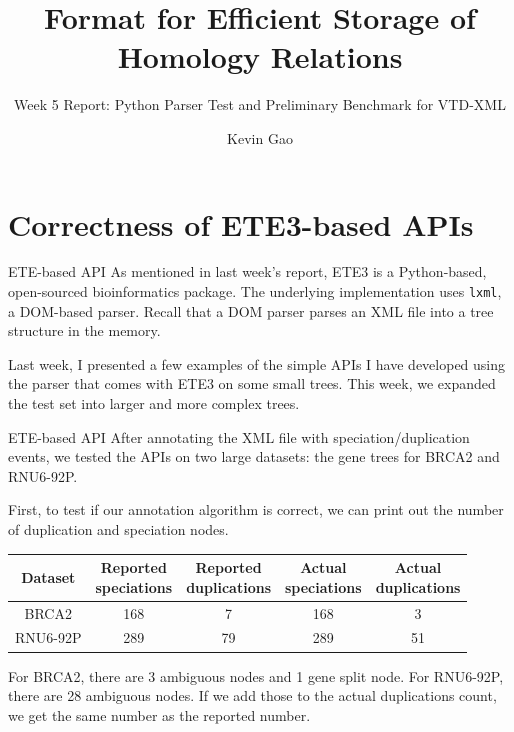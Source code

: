 \documentclass{beamer}
\title{Format for Efficient Storage of Homology Relations}
\subtitle{Week 5 Report: Python Parser Test and Preliminary Benchmark for VTD-XML}
\author{Kevin Gao}
\institute{University of Toronto}
\begin{document}
\frame{\titlepage}


\section{Correctness of ETE3-based APIs}

\begin{frame}{ETE-based API}
    As mentioned in last week's report, ETE3 is a Python-based, open-sourced bioinformatics package. The underlying implementation uses \texttt{lxml}, a DOM-based parser. Recall that a DOM parser parses an XML file into a tree structure in the memory.

    Last week, I presented a few examples of the simple APIs I have developed using the parser that comes with ETE3 on some small trees. This week, we expanded the test set into larger and more complex trees.
\end{frame}

\begin{frame}{ETE-based API}
    After annotating the XML file with speciation/duplication events, we tested the APIs on two large datasets: the gene trees for BRCA2 and RNU6-92P.

    First, to test if our annotation algorithm is correct, we can print out the number of duplication and speciation nodes.

    \begin{table}[htbp]
        \centering\begin{tabular}{c|c|c|c|c}
            Dataset & \shortstack{Reported \\ speciations} & \shortstack{Reported \\ duplications} & \shortstack{Actual \\ speciations} & \shortstack{Actual \\ duplications} \\
            \hline
            BRCA2 & 168 & 7 & 168 & 3 \\
            \hline
            RNU6-92P & 289 & 79 & 289 & 51
        \end{tabular}
    \end{table}
    For BRCA2, there are 3 ambiguous nodes and 1 gene split node. For RNU6-92P, there are 28 ambiguous nodes. If we add those to the actual duplications count, we get the same number as the reported number.
\end{frame}
\end{document}

